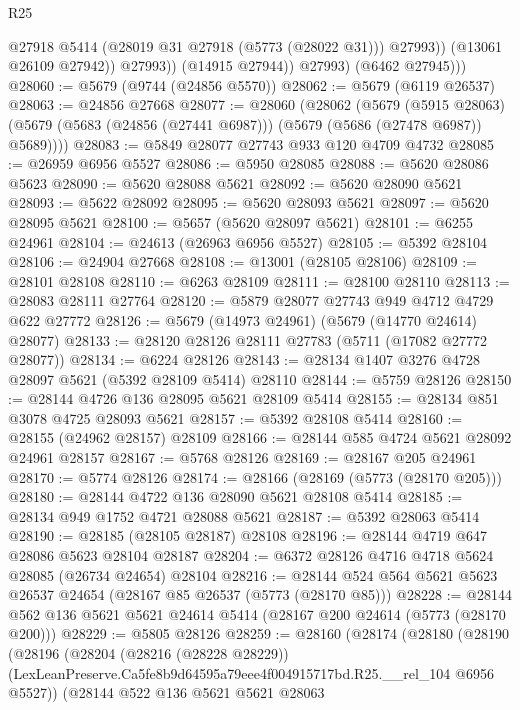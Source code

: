 \begin{lexlean}{R25}
\begin{coremodule}
                      @27918
                      @5414
                      (@28019 @31 @27918 (@5773 (@28022 @31)))
                      @27993))
                  (@13061 @26109 @27942))
                @27993))
            (@14915 @27944))
          @27993)
        (@6462 @27945)))
@28060 := @5679 (@9744 (@24856 @5570))
@28062 := @5679 (@6119 @26537)
@28063 := @24856 @27668
@28077 := @28060
    (@28062
      (@5679
        (@5915 @28063)
        (@5679 (@5683 (@24856 (@27441 @6987))) (@5679 (@5686 (@27478 @6987)) @5689))))
@28083 := @5849 @28077 @27743 @933 @120 @4709 @4732
@28085 := @26959 @6956 @5527
@28086 := @5950 @28085
@28088 := @5620 @28086 @5623
@28090 := @5620 @28088 @5621
@28092 := @5620 @28090 @5621
@28093 := @5622 @28092
@28095 := @5620 @28093 @5621
@28097 := @5620 @28095 @5621
@28100 := @5657 (@5620 @28097 @5621)
@28101 := @6255 @24961
@28104 := @24613 (@26963 @6956 @5527)
@28105 := @5392 @28104
@28106 := @24904 @27668
@28108 := @13001 (@28105 @28106)
@28109 := @28101 @28108
@28110 := @6263 @28109
@28111 := @28100 @28110
@28113 := @28083 @28111 @27764
@28120 := @5879 @28077 @27743 @949 @4712 @4729 @622 @27772
@28126 := @5679 (@14973 @24961) (@5679 (@14770 @24614) @28077)
@28133 := @28120 @28126 @28111 @27783 (@5711 (@17082 @27772 @28077))
@28134 := @6224 @28126
@28143 := @28134 @1407 @3276 @4728 @28097 @5621 (@5392 @28109 @5414) @28110
@28144 := @5759 @28126
@28150 := @28144 @4726 @136 @28095 @5621 @28109 @5414
@28155 := @28134 @851 @3078 @4725 @28093 @5621
@28157 := @5392 @28108 @5414
@28160 := @28155 (@24962 @28157) @28109
@28166 := @28144 @585 @4724 @5621 @28092 @24961 @28157
@28167 := @5768 @28126
@28169 := @28167 @205 @24961
@28170 := @5774 @28126
@28174 := @28166 (@28169 (@5773 (@28170 @205)))
@28180 := @28144 @4722 @136 @28090 @5621 @28108 @5414
@28185 := @28134 @949 @1752 @4721 @28088 @5621
@28187 := @5392 @28063 @5414
@28190 := @28185 (@28105 @28187) @28108
@28196 := @28144 @4719 @647 @28086 @5623 @28104 @28187
@28204 := @6372 @28126 @4716 @4718 @5624 @28085 (@26734 @24654) @28104
@28216 := @28144 @524 @564 @5621 @5623 @26537 @24654 (@28167 @85 @26537 (@5773 (@28170 @85)))
@28228 := @28144 @562 @136 @5621 @5621 @24614 @5414 (@28167 @200 @24614 (@5773 (@28170 @200)))
@28229 := @5805 @28126
@28259 := @28160
    (@28174
      (@28180
        (@28190
          (@28196
            (@28204
              (@28216 (@28228 @28229))
              (LexLeanPreserve.Ca5fe8b9d64595a79eee4f004915717bd.R25.__rel_104 @6956 @5527))
            (@28144
              @522
              @136
              @5621
              @5621
              @28063

\end{coremodule}
\end{lexlean}
